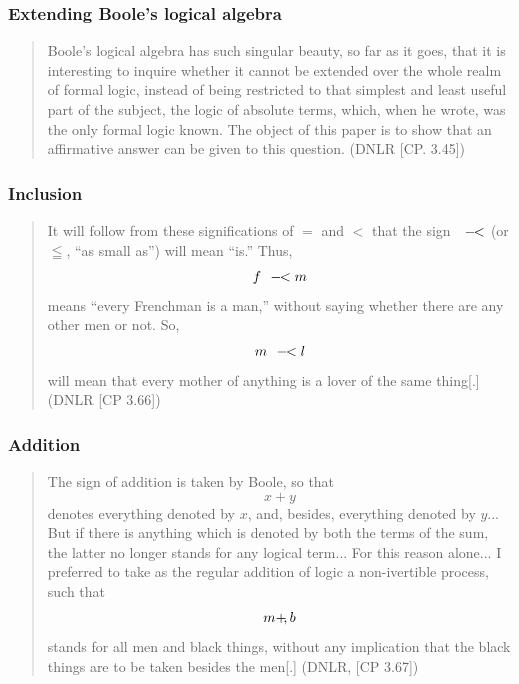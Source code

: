 \documentclass[compress,12pt]{beamer}
\newcommand*{\is}{\ \ -\mkern-7mu<}
\newcommand*{\add}{+\mkern-4mu,}
\begin{document}
\begin{frame}
    \frametitle{Extending Boole's logical algebra}
    \begin{quote}
        Boole’s logical algebra has such singular beauty, so far as it goes, that it is interesting to inquire whether it cannot be
        extended over the whole realm of formal logic, instead of being
        restricted to that simplest and least useful part of the subject,
        the logic of absolute terms, which, when he wrote, was the only
        formal logic known. The object of this paper is to show that an affirmative answer can be given to this question. (DNLR [CP. 3.45])
    \end{quote}
\end{frame}

\begin{frame}
    \frametitle{Inclusion}
    \begin{quote}
        It will follow from these significations of $=$ and $<$ that the sign $\is$ (or $\leqq$, ``as small as'') will mean ``is.'' Thus,
        $$f\is m$$
        means ``every Frenchman is a man,'' without saying whether there are any other men or not. So,
        $$m\is l$$
        will mean that every mother of anything is a lover of the same thing[.] (DNLR [CP 3.66])
    \end{quote}
\end{frame}

\begin{frame}
    \frametitle{Addition}
    \begin{quote}
        The sign of addition is taken by Boole, so that
        $$x+y$$
        denotes everything denoted by $x$, and, \textup{besides}, everything denoted by $y$... But if there is anything which is denoted by both the terms of the sum, the latter no longer stands for any logical term... For this reason alone... I preferred to take as the regular addition of logic a non-ivertible process, such that
        $$m\add b$$
        stands for all men and black things, without any implication that the black things are to be taken besides the men[.] (DNLR, [CP 3.67])
    \end{quote}
\end{frame}
\end{document}

